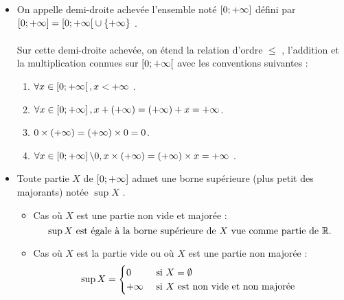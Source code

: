 \begin{defprop}
    \begin{itemize}
    \item  On appelle demi-droite achevée l’ensemble noté \(\left[0;+\infty\right]\) défini par \(\left[0;+\infty\right] = \left[0;+\infty\right[ \cup \left\lbrace+\infty \right\rbrace\) .\\~\\
        Sur cette demi-droite achevée, on étend la relation d’ordre \(\leq\) , l’addition et la multiplication connues sur \(\left[0;+\infty\right[\) avec les conventions suivantes :
        \begin{enumerate}
            \item \(\forall x \in  \left[0;+\infty\right[ , x < +\infty\) .
            \item \(\forall x \in  \left[0;+\infty\right] , x + (+\infty ) = (+\infty ) + x = +\infty \).
            \item \(0 \times  (+\infty ) = (+\infty ) \times  0 = 0\).
            \item \(\forall x \in  \left[0;+\infty\right] \backslash {0} , x \times  (+\infty ) = (+\infty ) \times  x = +\infty\) .
        \end{enumerate}
    \item Toute partie \(X\) de \(\left[0;+\infty\right]\) admet une borne supérieure (plus petit des majorants) notée \(\sup X\) .
        \begin{itemize}
            \item Cas où \(X\) est une partie non vide et majorée :
                \[\sup X \text{ est égale à la borne supérieure de } X \text{ vue comme partie de }\mathbb{R}.\]
            \item Cas où \(X\) est la partie vide ou où \(X\) est une partie non majorée :
                \[\sup X =\begin{cases}
                    0 &\text{ si } X = \emptyset\\
                    +\infty &\text{ si }X \text{ est non vide et non majorée }
                \end{cases}\]
        \end{itemize}
    \end{itemize}
\end{defprop}
